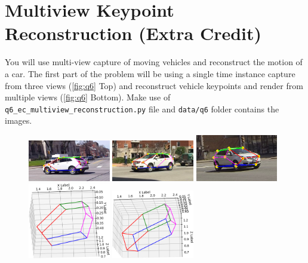 \section{Multiview Keypoint Reconstruction (Extra Credit)}
\label{sec:kps_recon}
You will use multi-view capture of moving vehicles and reconstruct the motion of a car. The first part of the problem will be using a single time instance capture from three views (\autoref{fig:q6} Top) and reconstruct vehicle keypoints and render from multiple views (\autoref{fig:q6} Bottom). Make use of\\\texttt{q6\_ec\_multiview\_reconstruction.py} file and \texttt{data/q6} folder contains the images.

\begin{figure}[t]
    \centering
    \includegraphics[width=0.32\textwidth]{images/q6/cam1_time4_det.png}
    \includegraphics[width=0.32\textwidth]{images/q6/cam2_time4_det.png}
    \includegraphics[width=0.32\textwidth]{images/q6/cam3_time4_det.png}\\
    \includegraphics[width=0.32\textwidth]{images/q6/time4_recon_1.png}
    \includegraphics[width=0.32\textwidth]{images/q6/time4_recon_2.png}

\end{figure}
